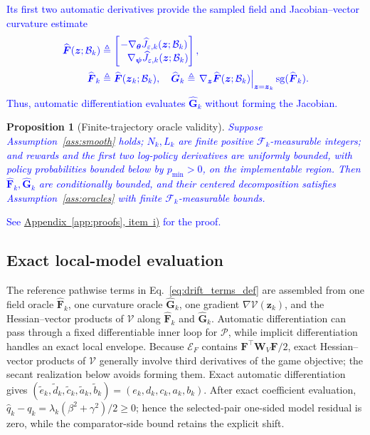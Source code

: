 \documentclass[journal]{IEEEtran}
\newtheorem{proposition}{Proposition}
\theoremstyle{remark}
\newcommand{\bz}{\boldsymbol{z}}
\newcommand{\btheta}{\boldsymbol{\theta}}
\newcommand{\bpsi}{\boldsymbol{\psi}}
\newcommand{\bW}{\boldsymbol{W}}
\newcommand{\bF}{\boldsymbol{F}}
\newcommand{\hatF}{\widehat{\boldsymbol{F}}}
\newcommand{\hatG}{\widehat{\boldsymbol{G}}}
\newcommand{\Vk}{\mathcal{V}}
\newcommand{\cE}{\mathcal{E}}
\newcommand{\cP}{\mathcal{P}}
\begin{document}
	\textcolor{blue}{Its first two automatic derivatives provide the sampled field and Jacobian--vector curvature estimate}
	\[
	\textcolor{blue}{
	\begin{aligned}
	\widehat{\bF}(\bz;\mathcal B_k)
	&\triangleq
	\begin{bmatrix}
	-\nabla_{\btheta}\widehat J_{\varepsilon,k}(\bz;\mathcal B_k)\\
	\phantom{-}\nabla_{\bpsi}\widehat J_{\varepsilon,k}(\bz;\mathcal B_k)
	\end{bmatrix},\\
	\hatF_k
	&\triangleq\widehat{\bF}(\bz_k;\mathcal B_k),\quad
	\hatG_k
	\triangleq
	\left.\nabla_{\bz}\widehat{\bF}(\bz;\mathcal B_k)\right|_{\bz=\bz_k}
	\operatorname{sg}(\hatF_k).
	\end{aligned}}
	\]
	\textcolor{blue}{Thus, automatic differentiation evaluates $\hatG_k$ without forming the Jacobian.}
	\begin{proposition}[Finite-trajectory oracle validity]\label{prop:trajectory_oracle_validity}
		\textcolor{blue}{Suppose Assumption~\ref{ass:smooth} holds; $N_k,L_k$ are finite positive $\mathscr F_k$-measurable integers; and rewards and the first two log-policy derivatives are uniformly bounded, with policy probabilities bounded below by $p_{\min}>0$, on the implementable region. Then $\hatF_k,\hatG_k$ are conditionally bounded, and their centered decomposition satisfies Assumption~\ref{ass:oracles} with finite $\mathscr F_k$-measurable bounds.}
	\end{proposition}
\textcolor{blue}{See \hyperref[app:trajectory_oracle_validity]{Appendix~\ref*{app:proofs}, item~i)} for the proof.}
	
	\subsection{Exact local-model evaluation}
	The reference pathwise terms in Eq.~\eqref{eq:drift_terms_def} are assembled from one field oracle $\hatF_{k}$, one curvature oracle $\hatG_{k}$, one gradient $\nabla\Vk(\bz_k)$, and the Hessian--vector products of $\Vk$ along $\hatF_k$ and $\hatG_k$.
	Automatic differentiation can pass through a fixed differentiable inner loop for $\cP$, while implicit differentiation handles an exact local envelope.
	Because $\cE_F$ contains $\bF^\top\bW_V\bF/2$, exact Hessian--vector products of $\Vk$ generally involve third derivatives of the game objective; the secant realization below avoids forming them.
	Exact automatic differentiation gives $(\tilde e_k,\tilde d_k,\tilde c_k,\tilde a_k,\tilde b_k)=(e_k,d_k,c_k,a_k,b_k)$.
	After exact coefficient evaluation, $\hat q_k-q_k=\lambda_k(\beta^2+\gamma^2)/2\ge0$; hence the selected-pair one-sided model residual is zero, while the comparator-side bound retains the explicit shift.
	
\end{document}
